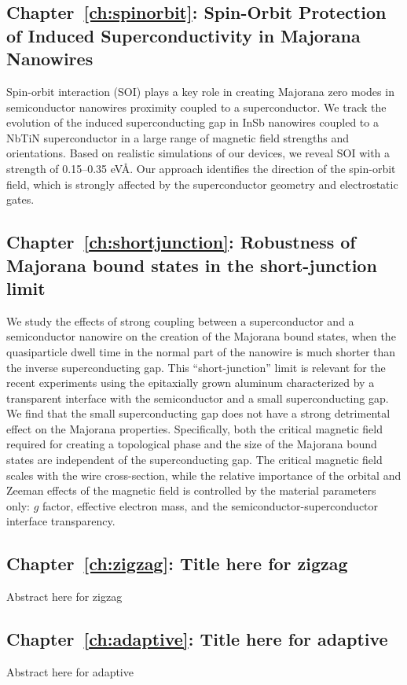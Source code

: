 \subsection{Chapter~\ref{ch:spinorbit}: Spin-Orbit Protection of Induced Superconductivity in Majorana Nanowires}
Spin-orbit interaction (SOI) plays a key role in creating Majorana zero modes in semiconductor nanowires proximity coupled to a superconductor.
We track the evolution of the induced superconducting gap in InSb nanowires coupled to a NbTiN superconductor in a large range of magnetic field strengths and orientations.
Based on realistic simulations of our devices, we reveal SOI with a strength of 0.15--0.35 eV\AA.
Our approach identifies the direction of the spin-orbit field, which is strongly affected by the superconductor geometry and electrostatic gates.
\vspace{1mm}

\subsection{Chapter~\ref{ch:shortjunction}: Robustness of Majorana bound states in the short-junction limit}
We study the effects of strong coupling between a superconductor and a semiconductor nanowire on the creation of the Majorana bound states, when the quasiparticle dwell time in the normal part of the nanowire is much shorter than the inverse superconducting gap.
This ``short-junction'' limit is relevant for the recent experiments using the epitaxially grown aluminum characterized by a transparent interface with the semiconductor and a small superconducting gap.
We find that the small superconducting gap does not have a strong detrimental effect on the Majorana properties.
Specifically, both the critical magnetic field required for creating a topological phase and the size of the Majorana bound states are independent of the superconducting gap.
The critical magnetic field scales with the wire cross-section, while the relative importance of the orbital and Zeeman effects of the magnetic field is controlled by the material parameters only: $g$ factor, effective electron mass, and the semiconductor-superconductor interface transparency.

\subsection{Chapter~\ref{ch:zigzag}: Title here for zigzag}
Abstract here for zigzag  %
\vspace{1mm}

\subsection{Chapter~\ref{ch:adaptive}: Title here for adaptive}
Abstract here for adaptive  %
\vspace{1mm}

